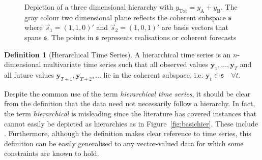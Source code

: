 \documentclass[12pt]{article}
\theoremstyle{definition}
\newtheorem{definition}{Definition}[section]
\begin{document}
     		\begin{figure}[H]
     	\centering
     	\vspace{-0.9cm}
     	\small
     	\resizebox{\linewidth}{!}{
     		
     	}
     	\caption{Depiction of a three dimensional hierarchy with $y_{\text{Tot}} = y_{\text{A}} + y_{\text{B}}$. The gray colour two dimensional plane reflects the coherent subspace $\mathfrak{s}$ where $\vec{s}_1 = (1,1,0)'$ and $\vec{s}_2 = (1, 0, 1)'$ are basis vectors that spans $\mathfrak{s}$. The points in $\mathfrak{s}$ represents realisations or coherent forecasts}\label{fig:3D_hierarchy}
     \end{figure}
     
	 \begin{definition}[Hierarchical Time Series]\label{def:cohspace}
	 	A hierarchical time series is an $n$-dimensional multivariate time series such that all observed values $\bm{y}_1,\ldots,\bm{y}_T$ and all future values $\bm{y}_{T+1},\bm{y}_{T+2},\ldots$  lie in the coherent subspace, i.e. $\bm{y}_t\in\mathfrak{s}\quad\forall t$.
	 \end{definition}
	 
	 Despite the common use of the term {\em hierarchical time series}, it should be clear from the definition that the data need not necessarily follow a hierarchy.   In fact, the term {\em hierarchical} is misleading since the literature has covered instances that cannot easily be depicted as hierarchies as in Figure~\ref{fig:basichier}.  These include .  Furthermore, although the definition makes clear reference to time series, this definition can be easily generalised to any vector-valued data for which some constraints are known to hold.
	 
	 
	 
	
%	
	
\end{document}
